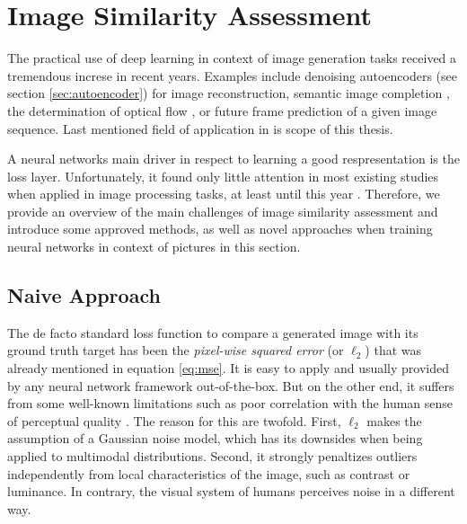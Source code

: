 \section{Image Similarity Assessment}

The practical use of deep learning in context of image generation tasks received a tremendous increse in recent years. Examples include denoising autoencoders (see section \ref{sec:autoencoder}) for image reconstruction, semantic image completion \parencite{sem-img-inpainting}, the determination of optical flow \parencite{flownet}, \parencite{flow-static-img} or future  frame prediction of a given image sequence. Last mentioned field of application in is scope of this thesis. 

A neural networks main driver in respect to learning a good respresentation is the loss layer. Unfortunately, it found only little attention in most existing studies when applied in image processing tasks, at least until this year \parencite{loss-func-img-proc}. Therefore, we provide an overview of the main challenges of image similarity assessment and introduce some approved methods, as well as novel approaches when training neural networks in context of pictures in this section.


\subsection{Naive Approach}

The de facto standard loss function to compare a generated image with its ground truth target has been the \textit{pixel-wise squared error} (or $ \ell_{2} $) that was already mentioned in equation \ref{eq:mse}. It is easy to apply and usually provided by any neural network framework out-of-the-box. But on the other end, it suffers from some well-known limitations such as poor correlation with the human sense of perceptual quality \parencite{loss-func-img-proc}. The reason for this are twofold. First, $ \ell_{2} $ makes the assumption of a Gaussian noise model, which has its downsides when being applied to multimodal distributions. Second, it strongly penaltizes outliers independently from local characteristics of the image, such as contrast or luminance. In contrary, the visual system of humans perceives noise in a different way.

